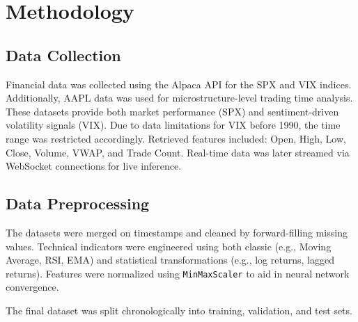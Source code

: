 \documentclass[conference]{IEEEtran}
\begin{document}


\section{Methodology}

\subsection{Data Collection}
Financial data was collected using the Alpaca API for the SPX and VIX indices. Additionally, AAPL data was used for microstructure-level trading time analysis. These datasets provide both market performance (SPX) and sentiment-driven volatility signals (VIX). Due to data limitations for VIX before 1990, the time range was restricted accordingly. Retrieved features included: Open, High, Low, Close, Volume, VWAP, and Trade Count. Real-time data was later streamed via WebSocket connections for live inference.

\subsection{Data Preprocessing}
The datasets were merged on timestamps and cleaned by forward-filling missing values. Technical indicators were engineered using both classic (e.g., Moving Average, RSI, EMA) and statistical transformations (e.g., log returns, lagged returns). Features were normalized using \texttt{MinMaxScaler} to aid in neural network convergence.

The final dataset was split chronologically into training, validation, and test sets.
\end{document}
